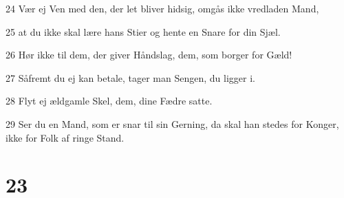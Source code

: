 \par 24 Vær ej Ven med den, der let bliver hidsig, omgås ikke vredladen Mand,
\par 25 at du ikke skal lære hans Stier og hente en Snare for din Sjæl.
\par 26 Hør ikke til dem, der giver Håndslag, dem, som borger for Gæld!
\par 27 Såfremt du ej kan betale, tager man Sengen, du ligger i.
\par 28 Flyt ej ældgamle Skel, dem, dine Fædre satte.
\par 29 Ser du en Mand, som er snar til sin Gerning, da skal han stedes for Konger, ikke for Folk af ringe Stand.

\chapter{23}

